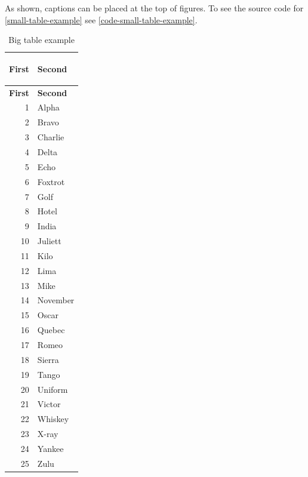 As shown, captions can be placed at the top of figures. 
To see the source code for \cref{small-table-example} see \cref{code-small-table-example}.

\begin{longtable}{r|>{\columncolor{white-near}}l}
    \caption{Big table example}\\
    \label{big-table-example}

    \textbf{First} & \textbf{Second}\\
    \hline
    \endfirsthead

    \textbf{First} & \textbf{Second}\\
    \hline
    \endhead
    
    1 & Alpha\\
    2 & Bravo\\
    3 & Charlie\\
    4 & Delta\\
    \rowcolor{yellow-dark}\color{white-pure}5 & Echo\\
    6 & Foxtrot\\
    7 & Golf\\
    8 & Hotel\\
    9 & India\\
    10 & Juliett\\
    11 & Kilo\\
    12 & Lima\\
    13 & Mike\\
    14 & November\\
    15 & Oscar\\
    16 & Quebec\\
    17 & Romeo\\
    18 & Sierra\\
    19 & Tango\\
    20 & Uniform\\
    21 & Victor\\
    22 & Whiskey\\
    23 & X-ray\\
    24 & Yankee\\
    25 & Zulu\\
\end{longtable}

